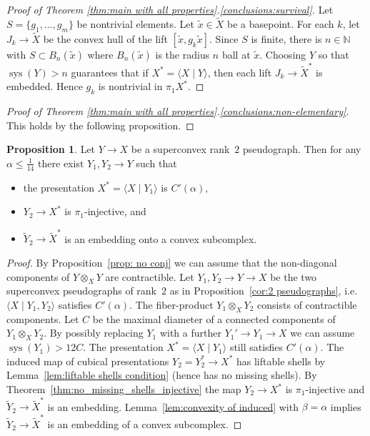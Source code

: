 \documentclass[12pt,oneside]{amsart}
\theoremstyle{definition}
\newtheorem{prop}[thm]{Proposition}
\theoremstyle{definition}
\theoremstyle{remark}
\newcommand{\field}[1]{\mathbb{#1}}
\newcommand{\naturals}{\ensuremath{\field{N}}}
\DeclareMathOperator{\sys}{\mathrm sys}
\begin{document}
\begin{proof}[Proof of Theorem \ref{thm:main with all properties}.\eqref{conclusions:survival}]

Let $S=\{g_1,\ldots, g_m\}$ be nontrivial elements.
Let $\tilde x\in \widetilde X$ be a basepoint.
For each $k$, let $J_k\rightarrow \widetilde X$ be the convex hull of the lift $[\tilde x,g_k\tilde x]$. Since $S$ is finite,  there is $n \in \naturals$ with $S \subset B_n(\tilde x)$ where $B_n(\tilde x)$ is the radius $n$ ball at $\tilde x$. Choosing $Y$ so that $\sys(Y)> n$ guarantees that if  $X^*=\langle X\mid Y\rangle $, then 
each lift $J_k\rightarrow \widetilde X^*$ is embedded. 
Hence $g_k$ is  nontrivial  in $\pi_1X^*$.
\end{proof}

\begin{proof}[Proof of Theorem \ref{thm:main with all properties}.\eqref{conclusions:non-elementary}]
This holds by the following proposition.
\end{proof}

\begin{prop}\label{prop: Y2 in the quotient by Y1}
    Let $Y\to X$ be a superconvex rank~$2$ pseudograph. Then for any $\alpha\leq \frac{1}{14}$ there exist $Y_1, Y_2\to Y$ such that 
    \begin{itemize}
        \item the presentation $X^* = \langle X\mid Y_1\rangle$ is $C'(\alpha)$,
        \item $Y_2\to X^*$ is $\pi_1$-injective, and
        \item $\widetilde Y_2\to \widetilde X^*$ is an embedding onto a convex subcomplex.
    \end{itemize}
\end{prop}
\begin{proof}
    By Proposition~\ref{prop: no conj} we can assume that the non-diagonal components of $Y\otimes_X Y$ are contractible.
    Let $Y_1, Y_2 \to Y\to X$ be the two superconvex pseudographs of rank~$2$ as in Proposition~\ref{cor:2 pseudographs}, i.e.\ $\langle X\mid Y_1, Y_2\rangle$ satisfies $C'(\alpha)$. The fiber-product $Y_1\otimes_X Y_2$ consists of contractible components. Let $C$ be the maximal diameter of a connected components of $Y_1\otimes_X Y_2$. By possibly replacing $Y_1$ with a further $Y_1'\rightarrow Y_1\rightarrow X$ we can assume $\sys(Y_1)> 12 C$. The presentation $X^* = \langle X \mid Y_1\rangle$ still satisfies $C'(\alpha)$. The induced map of cubical presentations $Y_2 = Y_2^*\to X^*$ has liftable shells by Lemma~\ref{lem:liftable shells condition} (hence has no missing shells). By Theorem~\ref{thm:no_missing_shells_injective} the map $Y_2 \to X^*$ is $\pi_1$-injective and $\widetilde Y_2\to \widetilde X^*$ is an embedding.
     Lemma~\ref{lem:convexity of induced} with $\beta = \alpha$ implies $\widetilde Y_2\to \widetilde X^*$ is an embedding of a convex subcomplex.
\end{proof}
\end{document}
